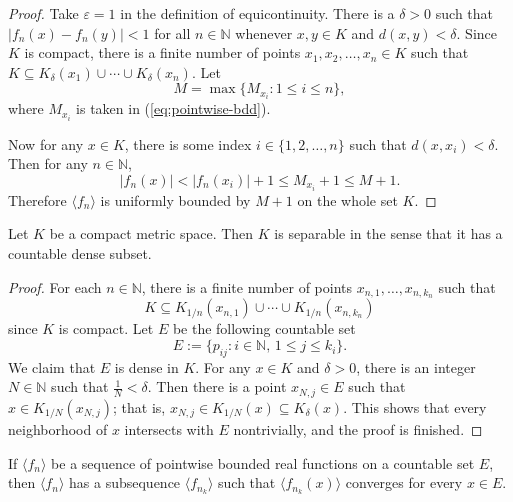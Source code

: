 \documentclass[11pt]{article}
\begin{document}
\begin{proof}
  Take $\varepsilon = 1$ in the definition of equicontinuity.
  There is a $\delta > 0$ such that $|f_n(x) - f_n(y)| < 1$ for all $n \in \mathbb{N}$ whenever $x,y \in K$ and $d(x,y) < \delta$.
  Since $K$ is compact, there is a finite number of points $x_1, x_2, \dots, x_n \in K$ such that $K \subseteq K_\delta(x_1) \cup \cdots \cup K_\delta(x_n)$.  Let
  \[
    M = \max \{ M_{x_i} \colon 1 \leqslant i \leqslant n \},
  \]
  where $M_{x_i}$ is taken in (\ref{eq:pointwise-bdd}).

  Now for any $x \in K$, there is some index $i \in \{1, 2, \dots, n \}$ such that $d(x, x_i) < \delta$.
  Then for any $n \in \mathbb{N}$,
  \[
    |f_n(x)| < |f_n(x_i)| + 1 \leqslant M_{x_i} + 1 \leqslant M + 1.
  \]
  Therefore $\langle f_n \rangle$ is uniformly bounded by $M + 1$ on the whole set $K$.
\end{proof}

\begin{lem}
  \label{lem:cpt-separable}
  Let $K$ be a compact metric space.  Then $K$ is separable in the sense that it has a countable dense subset.
\end{lem}

\begin{proof}
  For each $n \in \mathbb{N}$, there is a finite number of points $x_{n,1}, \dots, x_{n,k_n}$ such that
  \[
    K \subseteq K_{1/n}(x_{n,1}) \cup \cdots \cup K_{1/n}(x_{n,k_n})
  \]
  since $K$ is compact.
  Let $E$ be the following countable set
  \[
    E := \{ p_{ij} \colon i \in \mathbb{N}, \, 1 \leqslant j \leqslant k_i \}.
  \]
  We claim that $E$ is dense in $K$.
  For any $x \in K$ and $\delta > 0$, there is an integer $N \in \mathbb{N}$ such that $\frac1N < \delta$.  Then there is a point $x_{N,j} \in E$ such that $x \in K_{1/N}(x_{N,j})$; that is, $x_{N,j} \in K_{1/N}(x) \subseteq K_\delta(x)$.  This shows that every neighborhood of $x$ intersects with $E$ nontrivially, and the proof is finished.
\end{proof}

\begin{lem}
  \label{lem:pointwise-countable}
  If $\langle f_n \rangle$ be a sequence of pointwise bounded real functions on a countable set $E$, then $\langle f_n \rangle$ has a subsequence $\langle f_{n_k} \rangle$ such that $\langle f_{n_k}(x) \rangle$ converges for every $x \in E$.
\end{lem}
\end{document}
